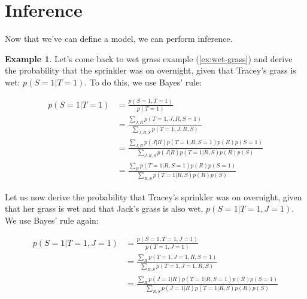 \documentclass[12pt, a4paper]{article}
\theoremstyle{definition}
\newtheorem{example}{Example}[section]
\numberwithin{figure}{section}
\numberwithin{equation}{section}
\numberwithin{table}{section}
\begin{document}


\section{Inference}
Now that we've can define a model, we can perform inference.

\begin{example}
Let's come back to wet grass example (\ref{ex:wet-grass}) and derive the probability that the sprinkler was on overnight, given that Tracey's grass is wet: $p(S = 1 | T = 1)$. To do this, we use Bayes' rule:

\begin{align}
p(S = 1 | T = 1)
&= \frac{p(S = 1, T = 1)}{p(T = 1)}\\
&= \frac{\sum_{J,R} p(T = 1, J, R, S = 1)}{\sum_{J,R,S} p(T = 1, J, R, S)}\\
&= \frac{\sum_{J,R} p(J|R)p(T = 1|R, S = 1)p(R)p(S = 1)}{\sum_{J,R,S} p(J|R)p(T = 1|R, S)p(R)p(S)}\\
&= \frac{\sum_{R} p(T = 1|R, S = 1)p(R)p(S = 1)}{\sum_{R,S} p(T = 1|R, S)p(R)p(S)}
\end{align}


Let us now derive the probability that Tracey's sprinkler was on overnight, given that her grass is wet and that Jack’s grass is also wet, $p(S = 1|T = 1, J = 1)$. We use Bayes' rule again:

\begin{align}
p(S = 1 | T = 1, J = 1)
&= \frac{p(S = 1, T = 1, J = 1)}{p(T = 1, J = 1)}\\
&= \frac{\sum_{R} p(T = 1, J = 1, R, S = 1)}{\sum_{R,S} p(T = 1, J = 1, R, S)}\\
&= \frac{\sum_{R} p(J = 1|R)p(T = 1|R, S = 1)p(R)p(S = 1)}{\sum_{R,S} p(J = 1|R)p(T = 1|R, S)p(R)p(S)}
\end{align}

\end{example}
\end{document}
